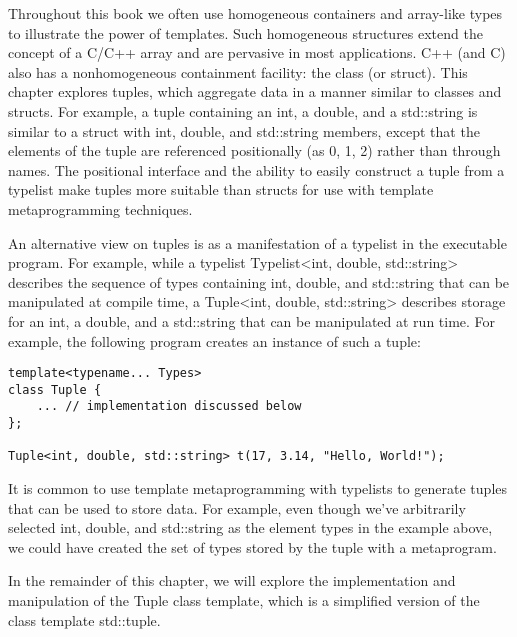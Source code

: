 Throughout this book we often use homogeneous containers and array-like types to illustrate the power of templates. Such homogeneous structures extend the concept of a C/C++ array and are pervasive in most applications. C++ (and C) also has a nonhomogeneous containment facility: the class (or struct). This chapter explores tuples, which aggregate data in a manner similar to classes and structs. For example, a tuple containing an int, a double, and a std::string is similar to a struct with int, double, and std::string members, except that the elements of the tuple are referenced positionally (as 0, 1, 2) rather than through names. The positional interface and the ability to easily construct a tuple from a typelist make tuples more suitable than structs for use with template metaprogramming techniques.

An alternative view on tuples is as a manifestation of a typelist in the executable program. For example, while a typelist Typelist<int, double, std::string> describes the sequence of types
containing int, double, and std::string that can be manipulated at compile time, a Tuple<int, double, std::string> describes storage for an int, a double, and a std::string that can be manipulated at run time. For example, the following program creates an instance of such a tuple:

\begin{lstlisting}[style=styleCXX]
template<typename... Types>
class Tuple {
	... // implementation discussed below
};

Tuple<int, double, std::string> t(17, 3.14, "Hello, World!");
\end{lstlisting}

It is common to use template metaprogramming with typelists to generate tuples that can be used to store data. For example, even though we’ve arbitrarily selected int, double, and std::string as the element types in the example above, we could have created the set of types stored by the tuple with a metaprogram.

In the remainder of this chapter, we will explore the implementation and manipulation of the Tuple class template, which is a simplified version of the class template std::tuple.






























